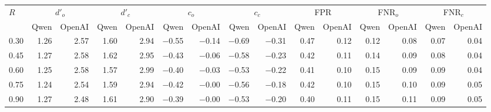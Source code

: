 \begin{tabular}{l*{14}{r}}
\toprule
$R$ & \multicolumn{2}{c}{$d'_o$} & \multicolumn{2}{c}{$d'_c$} & \multicolumn{2}{c}{$c_o$} & \multicolumn{2}{c}{$c_c$} & \multicolumn{2}{c}{FPR} & \multicolumn{2}{c}{FNR$_o$} & \multicolumn{2}{c}{FNR$_c$} \\
\cmidrule(lr){2-3} \cmidrule(lr){4-5} \cmidrule(lr){6-7} \cmidrule(lr){8-9} \cmidrule(lr){10-11} \cmidrule(lr){12-13} \cmidrule(lr){14-15}
 & Qwen & OpenAI & Qwen & OpenAI & Qwen & OpenAI & Qwen & OpenAI & Qwen & OpenAI & Qwen & OpenAI & Qwen & OpenAI \\
\midrule
0.30 & 1.26 & 2.57 & 1.60 & 2.94 & $-$0.55 & $-$0.14 & $-$0.69 & $-$0.31 & 0.47 & 0.12 & 0.12 & 0.08 & 0.07 & 0.04 \\
0.45 & 1.27 & 2.58 & 1.62 & 2.95 & $-$0.43 & $-$0.06 & $-$0.58 & $-$0.23 & 0.42 & 0.11 & 0.14 & 0.09 & 0.08 & 0.04 \\
0.60 & 1.25 & 2.58 & 1.57 & 2.99 & $-$0.40 & $-$0.03 & $-$0.53 & $-$0.22 & 0.41 & 0.10 & 0.15 & 0.09 & 0.09 & 0.04 \\
0.75 & 1.24 & 2.54 & 1.59 & 2.94 & $-$0.42 & $-$0.00 & $-$0.56 & $-$0.18 & 0.42 & 0.10 & 0.15 & 0.10 & 0.09 & 0.05 \\
0.90 & 1.27 & 2.48 & 1.61 & 2.90 & $-$0.39 & $-$0.00 & $-$0.53 & $-$0.20 & 0.40 & 0.11 & 0.15 & 0.11 & 0.09 & 0.05 \\
\bottomrule
\end{tabular}
